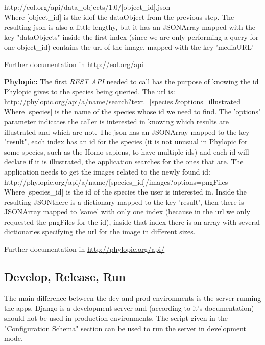 \documentclass[10pt]{article}
\begin{document}
http://eol.org/api/data\_objects/1.0/[object\_id].json\\

Where [object\_id] is the idof the dataObject from the previous step. The resulting json is also a little lengthy, but it has an JSONArray mapped with the key "dataObjects" inside the first index (since we are only performing a query for one object\_id) contains the url of the image, mapped with the key 'mediaURL'

Further documentation in \href{http://eol.org/api}{http://eol.org/api}

\textbf{Phylopic:} The first \textit{REST API} needed to call has the purpose of knowing the id Phylopic gives to the species being queried. The url is:\\

http://phylopic.org/api/a/name/search?text=[species]\&options=illustrated\\

Where [species] is the name of the species whose id we need to find. The 'options' parameter indicates the caller is interested in knowing which results are illustrated and which are not. The json has an JSONArray mapped to the key "result", each index has an id for the species (it is not unusual in Phylopic for some species, such as the Homo-sapiens, to have multiple ids) and each id will declare if it is illustrated, the application searches for the ones that are. The application needs to get the images related to the newly found id:\\

http://phylopic.org/api/a/name/[species\_id]/images?options=pngFiles\\

Where [species\_id] is the id of the species the user is interested in. Inside the resulting JSONthere is a dictionary mapped to the key 'result', then there is JSONArray mapped to 'same' with only one index (because in the url we only requested the pngFiles for the id), inside that index there is an array with several dictionaries specifying the url for the image in different sizes.

Further documentation in \href{http://phylopic.org/api/}{http://phylopic.org/api/}
 
 \subsection{Develop, Release, Run}
 
The main difference between the dev and prod environments is the server running the apps. Django is a development server and (according to it's documentation) should not be used in production environments. The script given in the "Configuration Schema" section can be used to run the server in development mode. 
\end{document}
